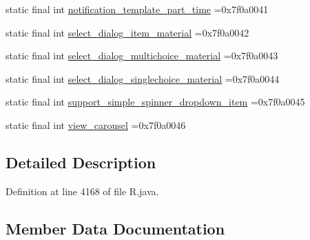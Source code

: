 \begin{DoxyCompactItemize}
\item 
static final int \mbox{\hyperlink{classcom_1_1example_1_1trainawearapplication_1_1_r_1_1layout_a83d0abe0cb4306cf1291fc209c5efcd0}{notification\+\_\+template\+\_\+part\+\_\+time}} =0x7f0a0041
\item 
static final int \mbox{\hyperlink{classcom_1_1example_1_1trainawearapplication_1_1_r_1_1layout_aa320483df1d4c8b348eb70e205e3eef7}{select\+\_\+dialog\+\_\+item\+\_\+material}} =0x7f0a0042
\item 
static final int \mbox{\hyperlink{classcom_1_1example_1_1trainawearapplication_1_1_r_1_1layout_a2371087ea57d7bb00f572c1c3e436931}{select\+\_\+dialog\+\_\+multichoice\+\_\+material}} =0x7f0a0043
\item 
static final int \mbox{\hyperlink{classcom_1_1example_1_1trainawearapplication_1_1_r_1_1layout_a7627206dd4b711c18f28ad1ce46d0455}{select\+\_\+dialog\+\_\+singlechoice\+\_\+material}} =0x7f0a0044
\item 
static final int \mbox{\hyperlink{classcom_1_1example_1_1trainawearapplication_1_1_r_1_1layout_a4bfe41483221a76a61ceb29c5b586e74}{support\+\_\+simple\+\_\+spinner\+\_\+dropdown\+\_\+item}} =0x7f0a0045
\item 
static final int \mbox{\hyperlink{classcom_1_1example_1_1trainawearapplication_1_1_r_1_1layout_aabf14a74425ec5b01a6a16fb4ed9dcab}{view\+\_\+carousel}} =0x7f0a0046
\end{DoxyCompactItemize}


\subsection{Detailed Description}


Definition at line 4168 of file R.\+java.



\subsection{Member Data Documentation}
\mbox{\label{classcom_1_1example_1_1trainawearapplication_1_1_r_1_1layout_a2e2d17438659ec80939e8cbe284b3098}} 
